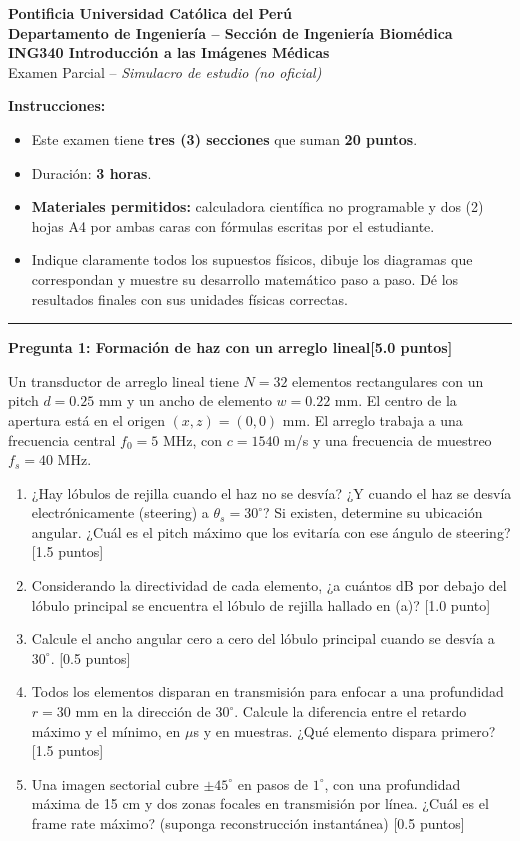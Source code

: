 \documentclass[11pt,a4paper]{article}
\newcommand{\sect}[1]{\vspace{10pt}{\large\bfseries #1}\par\vspace{-6pt}\rule{\linewidth}{0.4pt}\par}
\newcommand{\question}[2]{\vspace{6pt}\textbf{#1}\hfill\textbf{[#2]}\par}
\newcommand{\pts}[1]{\hfill[#1]}
\begin{document}
\thispagestyle{fancy}
\begin{center}
{\LARGE\bfseries Pontificia Universidad Católica del Perú}\\[4pt]
{\large\bfseries Departamento de Ingeniería -- Sección de Ingeniería Biomédica}\\[10pt]
{\Large\bfseries ING340 Introducción a las Imágenes Médicas}\\[8pt]
Examen Parcial -- \textit{Simulacro de estudio (no oficial)}
\end{center}

\vspace{8pt}
\textbf{Instrucciones:}
\begin{itemize}[leftmargin=2em,itemsep=0pt]
\item Este examen tiene \textbf{tres (3) secciones} que suman \textbf{20 puntos}.
\item Duración: \textbf{3 horas}.
\item \textbf{Materiales permitidos:} calculadora científica no programable y dos (2) hojas A4 por ambas caras con fórmulas escritas por el estudiante.
\item Indique claramente todos los supuestos físicos, dibuje los diagramas que correspondan y muestre su desarrollo matemático paso a paso. Dé los resultados finales con sus unidades físicas correctas.
\end{itemize}

\sect{Ultrasonido}

\question{Pregunta 1: Formación de haz con un arreglo lineal}{5.0 puntos}
Un transductor de arreglo lineal tiene $N = 32$ elementos rectangulares con un pitch $d = 0.25$ mm y un ancho de elemento $w = 0.22$ mm. El centro de la apertura está en el origen $(x, z) = (0, 0)$ mm. El arreglo trabaja a una frecuencia central $f_0 = 5$ MHz, con $c = 1540$ m/s y una frecuencia de muestreo $f_s = 40$ MHz.
\begin{enumerate}
\item ¿Hay lóbulos de rejilla cuando el haz no se desvía? ¿Y cuando el haz se desvía electrónicamente (steering) a $\theta_s = 30^\circ$? Si existen, determine su ubicación angular. ¿Cuál es el pitch máximo que los evitaría con ese ángulo de steering? \pts{1.5 puntos}
\item Considerando la directividad de cada elemento, ¿a cuántos dB por debajo del lóbulo principal se encuentra el lóbulo de rejilla hallado en (a)? \pts{1.0 punto}
\item Calcule el ancho angular cero a cero del lóbulo principal cuando se desvía a $30^\circ$. \pts{0.5 puntos}
\item Todos los elementos disparan en transmisión para enfocar a una profundidad $r = 30$ mm en la dirección de $30^\circ$. Calcule la diferencia entre el retardo máximo y el mínimo, en $\mu$s y en muestras. ¿Qué elemento dispara primero? \pts{1.5 puntos}
\item Una imagen sectorial cubre $\pm45^\circ$ en pasos de $1^\circ$, con una profundidad máxima de 15 cm y dos zonas focales en transmisión por línea. ¿Cuál es el frame rate máximo? (suponga reconstrucción instantánea) \pts{0.5 puntos}
\end{enumerate}
\end{document}

